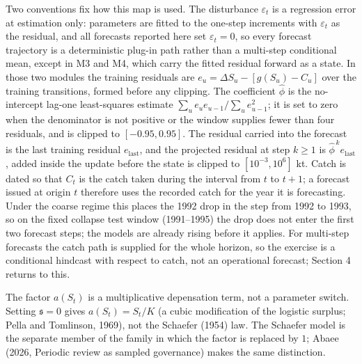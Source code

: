 \documentclass[11pt]{article}
\begin{document}
Two conventions fix how this map is used. The disturbance
\(\varepsilon_t\) is a regression error at estimation only: parameters
are fitted to the one-step increments with \(\varepsilon_t\) as the
residual, and all forecasts reported here set \(\varepsilon_t = 0\), so
every forecast trajectory is a deterministic plug-in path rather than a
multi-step conditional mean, except in M3 and M4, which carry the
fitted residual forward as a state. In those two modules the training residuals are
\(e_u = \Delta S_u - [g(S_u) - C_u]\) over the training transitions,
formed before any clipping. The coefficient \(\hat\phi\) is the
no-intercept lag-one least-squares estimate
\(\sum_u e_u e_{u-1}/\sum_u e_{u-1}^2\); it is set to zero when the
denominator is not positive or the window supplies fewer than four
residuals, and is clipped to \([-0.95, 0.95]\). The residual carried
into the forecast is the last training residual \(e_{\mathrm{last}}\),
and the projected residual at step \(k \ge 1\) is
\(\hat\phi^{\,k} e_{\mathrm{last}}\), added inside the update before
the state is clipped to \([10^{-3}, 10^{6}]\) kt.
Catch is dated so that \(C_t\) is the catch taken during the interval
from \(t\) to \(t+1\); a forecast issued at origin \(t\) therefore
uses the recorded catch for the year it is forecasting. Under the
coarse regime this places the 1992 drop in the step from 1992 to 1993,
so on the fixed collapse test window (1991--1995) the drop does not
enter the first two forecast steps; the models are already rising before
it applies.
For multi-step forecasts the catch path is supplied for the
whole horizon, so the exercise is a conditional hindcast with respect to
catch, not an operational forecast; Section 4 returns to this.

The factor \(a(S_t)\) is a multiplicative depensation term, not a
parameter switch. Setting \(\mathfrak s=0\) gives \(a(S_t)=S_t/K\) (a
cubic modification of the logistic surplus; Pella and
Tomlinson, 1969), not the Schaefer (1954) law. The
Schaefer model is the separate member of the family in which the factor
is replaced by \(1\); Abaee (2026, Periodic review as sampled governance) makes the same distinction.
\end{document}
